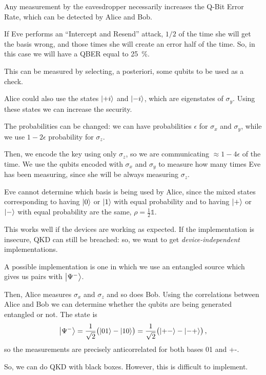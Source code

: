 \documentclass[main.tex]{subfiles}
\begin{document}
Any measurement by the eavesdropper necessarily increases the Q-Bit Error Rate, which can be detected by Alice and Bob. 

If Eve performs an ``Intercept and Resend'' attack, \(1/2\) of the time she will get the basis wrong, and those times she will create an error half of the time. 
So, in this case we will have a QBER equal to \SI{25}{\percent}. 

This can be measured by selecting, a posteriori, some qubits to be used as a check. 

Alice could also use the states \(\ket{+i}\) and \(\ket{-i}\), which are eigenstates of \(\sigma_{y}\). Using these states we can increase the security. 

The probabilities can be changed: we can have probabilities \(\epsilon \) for \(\sigma_{x}\) and \(\sigma_{y}\), while we use \(1-2\epsilon \) probability for \(\sigma_{z}\). 

Then, we encode the key using only \(\sigma_{z}\), so we are communicating \(\approx1 -4 \epsilon  \) of the time. 
We use the qubits encoded with \(\sigma_{x}\) and \(\sigma_{y}\) to measure how many times Eve has been measuring, since she will be always measuring \(\sigma_{z}\). 

Eve cannot determine which basis is being used by Alice, since the mixed states corresponding to having \(\ket{0}\) or \(\ket{1}\) with equal probability and to having \(\ket{+}\) or \(\ket{-}\) with equal probability are the same, \(\rho = \frac{1}{2} \mathbb{1}\). 

This works well if the devices are working as expected.
If the implementation is insecure, QKD can still be breached: so, we want to get \emph{device-independent} implementations. 

A possible implementation is one in which we use an entangled source which gives us pairs with \(\ket{\Psi^{-}}\). 

Then, Alice measures \(\sigma_{x}\) and \(\sigma_{z}\) and so does Bob. 
Using the correlations between Alice and Bob we can determine whether the qubits are being generated entangled or not. 
The state is 
%
\begin{align}
\ket{\Psi^{-}} = \frac{1}{\sqrt{2}} \qty(\ket{01} - \ket{10})
= \frac{1}{\sqrt{2}} \qty(\ket{+-} - \ket{- +})
\,,
\end{align}
%
so the measurements are precisely anticorrelated for both bases 01 and +-. 

So, we can do QKD with black boxes.
However, this is difficult to implement. 
\end{document}

